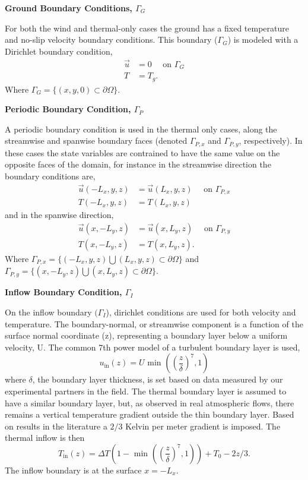 \textbf{Ground Boundary Conditions, $\Gamma_G$} 

For both the wind and thermal-only cases the ground has a fixed
temperature and no-slip velocity boundary conditions. This boundary 
($\Gamma_G$) is modeled with a Dirichlet boundary condition, 
\begin{align}
 \overrightarrow{u} &= 0 \quad \text{ on } \Gamma_G \\
 T &= T_g.
\end{align}
Where $\Gamma_G = \{(x,y,0) \subset \partial \Omega \} $. 

%
%
%
\textbf{Periodic Boundary Condition, $\Gamma_P$} 

A periodic boundary condition is used in the thermal only cases, 
along the streamwise and spanwise boundary faces 
(denoted $\Gamma_{P,x}$ and $\Gamma_{P,y}$, respectively). In these
cases the state variables  
are contrained to have the same value on the opposite faces of the domain, 
for instance in the streamwise direction the boundary conditions are, 
\begin{align}
 \overrightarrow{u}(-L_x,y,z) &= \overrightarrow{u}(L_x,y,z) \quad \text{ on } \Gamma_{P,x} \\
 T(-L_x,y,z) &= T(L_x,y,z)
\end{align}
and in the spanwise direction,
\begin{align}
 \overrightarrow{u}(x,-L_y,z) &= \overrightarrow{u}(x,L_y,z) \quad \text{ on } \Gamma_{P,y} \\
 T(x,-L_y,z) &= T(x,L_y,z). 
\end{align}
Where $\Gamma_{P,x} = \{(-L_x,y,z) \bigcup (L_x,y,z) \subset \partial
\Omega \}$  
and $\Gamma_{P,y} = \{(x,-L_y,z) \bigcup (x,L_y,z) \subset \partial
\Omega \}$. 

\textbf{Inflow Boundary Condition, $\Gamma_I$} 

On the inflow boundary $(\Gamma_I$), dirichlet conditions are used for both
velocity and temperature. The boundary-normal, or streamwise component 
is a function of the surface normal coordinate (z), representing a boundary 
layer below a uniform velocity, U.
The common 7th power model of a turbulent boundary layer is used,   
\begin{equation*}
  u_{\text{in}}(z) = U \text{ min }\left(\left(\frac{z}{\delta}\right)^7,1\right)
  \label{eq:bl_u}
\end{equation*}
where $\delta$, the boundary layer thickness, is set based on data
measured by our experimental partners in the field. 
The thermal boundary layer is assumed to have a similar boundary layer,
but, as observed in real atmospheric flows, there remains a vertical
temperature gradient outside the thin boundary layer. Based on
results in the literature a $2/3$ Kelvin per meter gradient is 
imposed\cite{Blocken2007238}. The thermal inflow is then  
\begin{equation*}
  T_{\text{in}}(z) = \Delta T \left(1- \text{ min
			}\left(\left(\frac{z}{\delta}\right)^7,1\right)\right)
  + T_0 - 2z/3.  
  \label{eq:bl_t}
\end{equation*}
The inflow boundary is at the surface $x=-L_x$.

